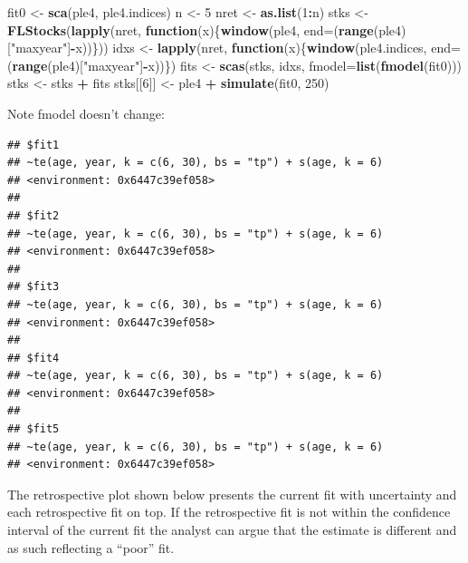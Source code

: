 \documentclass[
]{book}
\newenvironment{Shaded}{\begin{snugshade}}{\end{snugshade}}
\newcommand{\AttributeTok}[1]{\textcolor[rgb]{0.13,0.29,0.53}{#1}}
\newcommand{\ControlFlowTok}[1]{\textcolor[rgb]{0.13,0.29,0.53}{\textbf{#1}}}
\newcommand{\DecValTok}[1]{\textcolor[rgb]{0.00,0.00,0.81}{#1}}
\newcommand{\FunctionTok}[1]{\textcolor[rgb]{0.13,0.29,0.53}{\textbf{#1}}}
\newcommand{\NormalTok}[1]{#1}
\newcommand{\OtherTok}[1]{\textcolor[rgb]{0.56,0.35,0.01}{#1}}
\newcommand{\SpecialCharTok}[1]{\textcolor[rgb]{0.81,0.36,0.00}{\textbf{#1}}}
\newcommand{\StringTok}[1]{\textcolor[rgb]{0.31,0.60,0.02}{#1}}
\begin{document}
\begin{Shaded}
\begin{Highlighting}[]
\NormalTok{fit0 }\OtherTok{\textless{}{-}} \FunctionTok{sca}\NormalTok{(ple4, ple4.indices)}
\NormalTok{n }\OtherTok{\textless{}{-}} \DecValTok{5}
\NormalTok{nret }\OtherTok{\textless{}{-}} \FunctionTok{as.list}\NormalTok{(}\DecValTok{1}\SpecialCharTok{:}\NormalTok{n)}
\NormalTok{stks }\OtherTok{\textless{}{-}} \FunctionTok{FLStocks}\NormalTok{(}\FunctionTok{lapply}\NormalTok{(nret, }\ControlFlowTok{function}\NormalTok{(x)\{}\FunctionTok{window}\NormalTok{(ple4, }\AttributeTok{end=}\NormalTok{(}\FunctionTok{range}\NormalTok{(ple4)[}\StringTok{"maxyear"}\NormalTok{]}\SpecialCharTok{{-}}\NormalTok{x))\}))}
\NormalTok{idxs }\OtherTok{\textless{}{-}} \FunctionTok{lapply}\NormalTok{(nret, }\ControlFlowTok{function}\NormalTok{(x)\{}\FunctionTok{window}\NormalTok{(ple4.indices, }\AttributeTok{end=}\NormalTok{(}\FunctionTok{range}\NormalTok{(ple4)[}\StringTok{"maxyear"}\NormalTok{]}\SpecialCharTok{{-}}\NormalTok{x))\})}
\NormalTok{fits }\OtherTok{\textless{}{-}} \FunctionTok{scas}\NormalTok{(stks, idxs, }\AttributeTok{fmodel=}\FunctionTok{list}\NormalTok{(}\FunctionTok{fmodel}\NormalTok{(fit0)))}
\NormalTok{stks }\OtherTok{\textless{}{-}}\NormalTok{ stks }\SpecialCharTok{+}\NormalTok{ fits}
\NormalTok{stks[[}\DecValTok{6}\NormalTok{]] }\OtherTok{\textless{}{-}}\NormalTok{ ple4 }\SpecialCharTok{+} \FunctionTok{simulate}\NormalTok{(fit0, }\DecValTok{250}\NormalTok{)}
\end{Highlighting}
\end{Shaded}

Note fmodel doesn't change:

\begin{verbatim}
## $fit1
## ~te(age, year, k = c(6, 30), bs = "tp") + s(age, k = 6)
## <environment: 0x6447c39ef058>
## 
## $fit2
## ~te(age, year, k = c(6, 30), bs = "tp") + s(age, k = 6)
## <environment: 0x6447c39ef058>
## 
## $fit3
## ~te(age, year, k = c(6, 30), bs = "tp") + s(age, k = 6)
## <environment: 0x6447c39ef058>
## 
## $fit4
## ~te(age, year, k = c(6, 30), bs = "tp") + s(age, k = 6)
## <environment: 0x6447c39ef058>
## 
## $fit5
## ~te(age, year, k = c(6, 30), bs = "tp") + s(age, k = 6)
## <environment: 0x6447c39ef058>
\end{verbatim}

The retrospective plot shown below presents the current fit with uncertainty and each retrospective fit on top. If the retrospective fit is not within the confidence interval of the current fit the analyst can argue that the estimate is different and as such reflecting a ``poor'' fit.
\end{document}
